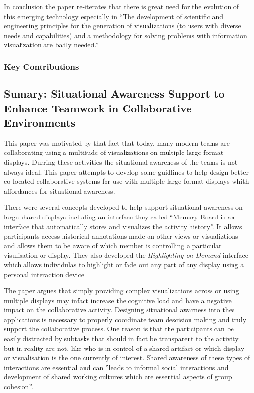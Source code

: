 \documentclass{sig-alternate}
\begin{document}
In conclusion the paper re-iterates that there is great need for the evolution
of this emerging technology especially in ``The development of scientific and
engineering principles for the generation of visualizations  (to users with
diverse needs and capabilities) and a methodology for solving problems with
information visualization are badly needed.''

\subsubsection{Key Contributions}
\subsection{Sumary: Situational Awareness Support to Enhance Teamwork
in Collaborative Environments \cite{Kulyk:2008:SituationalAwareness}}
This paper was motivated by that fact that today, many modern teams are
collaborating using a multitude of visualizations on multiple large format
displays. Durring these activities the situational awareness of the teams is not
always ideal. This paper attempts to develop some guidlines to help design
better co-located collaborative systems for use with multiple large format 
displays whith affordances for situational awareness. 

There were several concepts developed to help support situational awareness on
large shared displays including an interface they called ``Memory Board is
an interface that automatically stores and visualizes the activity history''. It
allows participants access historical annotations made on other views or
visualiztions and allows them to be aware of which member is controlling a
particular visulisation or display. They also developed the \emph{Highlighting
on Demand} interface which allows individulas to highlight or fade out any
part of any display using a personal interaction device.

The paper argues that simply providing complex visualizations across or using
multiple displays may infact increase the cognitive load and have a negative
impact on the collaborative activity. Designing situational awarness into thes
applications is necessary to properly coordinate team descision making and truly
support the collaborative process. One reason is that the participants can be
easily distracted by subtasks that should in fact be transparent to the activity but in
reality are not, like who is in control of a shared artifact or which display
or visualisation is the one currently of interest. Shared awareness of these
types of interactions are essential and can ''leads to informal social
interactions and development of shared working cultures which are essential
aspects of group cohesion''.
\end{document}
